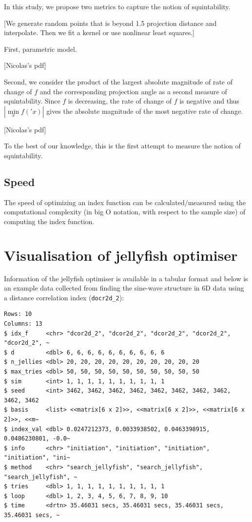 \documentclass[
  number,
  preprint,
  3p]{elsarticle}
\begin{document}
In this study, we propose two metrics to capture the notion of
squintability.

{[}We generate random points that is beyond 1.5 projection distance and
interpolate. Then we fit a kernel or use nonlinear least squares.{]}

First, parametric model.

{[}Nicolas's pdf{]}

Second, we consider the product of the largest absolute magnitude of
rate of change of \(f\) and the corresponding projection angle as a
second measure of squintability. Since \(f\) is decreasing, the rate of
change of \(f\) is negative and thus \(|\underset{x}{\min} f('x)|\)
gives the absolute magnitude of the most negative rate of change.

{[}Nicolas's pdf{]}

To the best of our knowledge, this is the first attempt to measure the
notion of squintability.

\subsection{Speed}\label{speed}

The speed of optimizing an index function can be calculated/measured
using the computational complexity (in big O notation, with respect to
the sample size) of computing the index function.

\section{Visualisation of jellyfish
optimiser}\label{visualisation-of-jellyfish-optimiser}

Information of the jellyfish optimiser is available in a tabular format
and below is an example data collected from finding the sine-wave
structure in 6D data using a distance correlation index
(\texttt{docr2d\_2}):

\begin{verbatim}
Rows: 10
Columns: 13
$ idx_f     <chr> "dcor2d_2", "dcor2d_2", "dcor2d_2", "dcor2d_2", "dcor2d_2", ~
$ d         <dbl> 6, 6, 6, 6, 6, 6, 6, 6, 6, 6
$ n_jellies <dbl> 20, 20, 20, 20, 20, 20, 20, 20, 20, 20
$ max_tries <dbl> 50, 50, 50, 50, 50, 50, 50, 50, 50, 50
$ sim       <int> 1, 1, 1, 1, 1, 1, 1, 1, 1, 1
$ seed      <int> 3462, 3462, 3462, 3462, 3462, 3462, 3462, 3462, 3462, 3462
$ basis     <list> <<matrix[6 x 2]>>, <<matrix[6 x 2]>>, <<matrix[6 x 2]>>, <<m~
$ index_val <dbl> 0.0247212373, 0.0033938502, 0.0463398915, 0.0486230801, -0.0~
$ info      <chr> "initiation", "initiation", "initiation", "initiation", "ini~
$ method    <chr> "search_jellyfish", "search_jellyfish", "search_jellyfish", ~
$ tries     <dbl> 1, 1, 1, 1, 1, 1, 1, 1, 1, 1
$ loop      <dbl> 1, 2, 3, 4, 5, 6, 7, 8, 9, 10
$ time      <drtn> 35.46031 secs, 35.46031 secs, 35.46031 secs, 35.46031 secs, ~
\end{verbatim}
\end{document}
